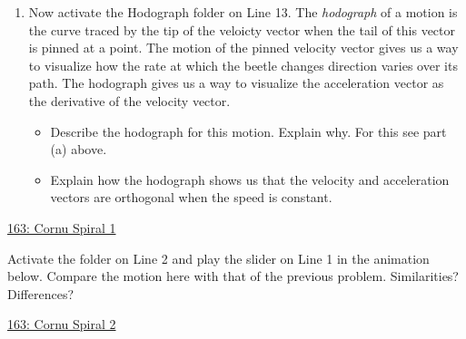 \documentclass{ximera}
\begin{document}
\begin{question}
\begin{enumerate}
\item Now activate the Hodograph folder on Line 13. The \emph{hodograph} of a motion is the curve traced by the tip of the veloicty vector when the tail of this vector is pinned at a point. The motion of the pinned velocity vector gives us a way to visualize how the rate at which the beetle changes direction varies over its path. The hodograph gives us a way to visualize the acceleration vector as the derivative of the velocity vector.

\begin{itemize}
\item Describe the hodograph for this motion. Explain why. For this see part (a) above.

\item Explain how the hodograph shows us that the velocity and acceleration vectors are orthogonal when the speed is constant.

\end{itemize} 


\begin{onlineOnly}
    \begin{center}
\end{center}
\end{onlineOnly}


\end{enumerate}
\href{https://www.desmos.com/3d/aqtl75oi1h}{163: Cornu Spiral 1}

\end{question}



\begin{question}  \label{Q34rr4tr354}
Activate the folder on Line 2 and play the slider on Line 1 in the animation below. Compare the motion here with that of the previous problem. Similarities? Differences?

\begin{onlineOnly}
    \begin{center}
\end{center}
\end{onlineOnly}


\href{https://www.desmos.com/3d/6jqsfb5ols}{163: Cornu Spiral 2}

\end{question}
\end{document}
